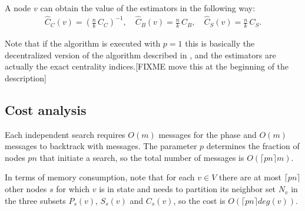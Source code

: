 A node $v$ can obtain the value of the estimators in the following way:
\begin{eqnarray*}
\widehat{C}_C(v) =  \left( \frac{n}{k} \, C_C \right)^{-1}, \quad
\widehat{C}_B(v) = \frac{n}{k} \, C_B, \quad
\widehat{C}_S(v) = \frac{n}{k} \, C_S .
\end{eqnarray*}

Note that if the algorithm is executed with $p=1$ this is basically the decentralized version of the algorithm described in \cite{brandes2001}, and the estimators are actually the exact centrality indices.[FIXME move this at the beginning of the description]

\subsection{Cost analysis}

Each independent search requires $O(m)$ messages for the \mdisc{} phase and $O(m)$ messages to backtrack with \mrep{} messages. The parameter $p$ determines the fraction of nodes $pn$ that initiate a \mdisc{} search, so the total number of messages is $O(\lceil pn \rceil m)$.

In terms of memory consumption, note that for each $v \in V$ there are at most $\lceil pn \rceil$ other nodes $s$ for which $v$ is in state  and needs to partition its neighbor set $N_v$ in the three subsets $P_s(v)$, $S_s(v)$ and $C_s(v)$, so the cost is $O(\lceil pn \rceil deg(v))$.